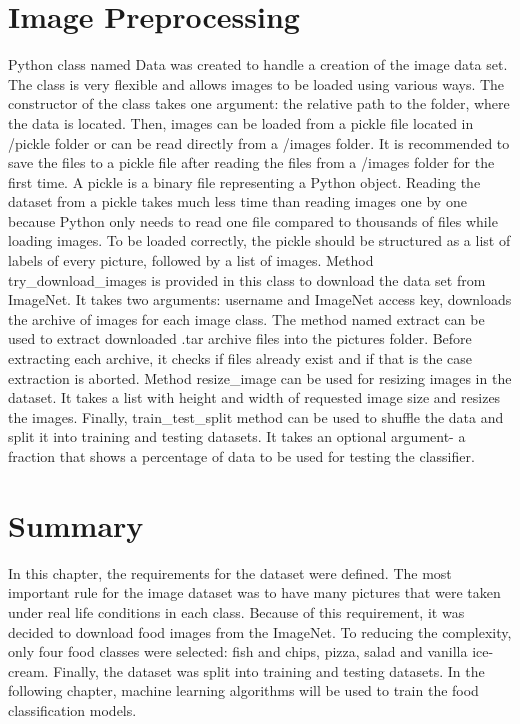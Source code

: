 \section {Image Preprocessing}
Python class named Data was created to handle a creation of the image data set. The class is very flexible and allows images to be loaded using various ways. The constructor of the class takes one argument: the relative path to the folder, where the data is located. Then, images can be loaded from a pickle file located in /pickle folder or can be read directly from a /images folder. It is recommended to save the files to a pickle file after reading the files from a /images folder for the first time. A pickle is a binary file representing a Python object. Reading the dataset from a pickle takes much less time than reading images one by one because Python only needs to read one file compared to thousands of files while loading images. To be loaded correctly, the pickle should be structured as a list of labels of every picture, followed by a list of images. Method try\_download\_images is provided in this class to download the data set from ImageNet. It takes two arguments: username and ImageNet access key, downloads the archive of images for each image class. The method named extract can be used to extract downloaded .tar archive files into the pictures folder. Before extracting each archive, it checks if files already exist and if that is the case extraction is aborted. Method resize\_image can be used for resizing images in the dataset. It takes a list with height and width of requested image size and resizes the images.  Finally, train\_test\_split method can be used to shuffle the data and split it into training and testing datasets. It takes an optional argument- a fraction that shows a percentage of data to be used for testing the classifier.

\section{Summary}
In this chapter, the requirements for the dataset were defined. The most important rule for the image dataset was to have many pictures that were taken under real life conditions in each class.  Because of this requirement, it was decided to download food images from the ImageNet. To reducing the complexity, only four food classes were selected: fish and chips, pizza, salad and vanilla ice-cream. Finally, the dataset was split into training and testing datasets.  In the following chapter, machine learning algorithms will be used to train the food classification models.